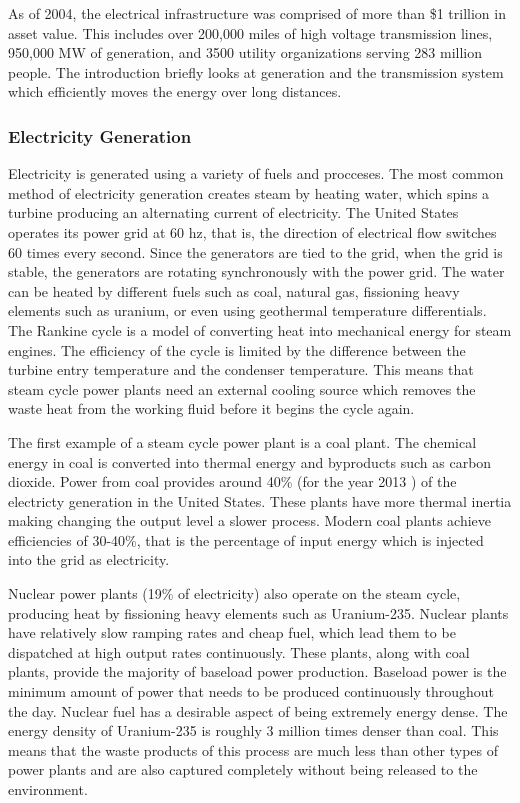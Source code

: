 	As of 2004, the electrical infrastructure was comprised of more than \$1 trillion in asset value.  This includes over 200,000 miles of high voltage transmission lines, 950,000 MW of generation, and 3500 utility organizations serving 283 million people.\cite{northeast_2003}  The introduction briefly looks at generation and the transmission system which efficiently moves the energy over long distances.

\subsubsection{Electricity Generation}
	Electricity is generated using a variety of fuels and procceses.  The most common method of electricity generation creates steam by heating water, which spins a turbine producing an alternating current of electricity.  The United States operates its power grid at 60 hz, that is, the direction of electrical flow switches 60 times every second.  Since the generators are tied to the grid, when the grid is stable, the generators are rotating synchronously with the power grid.  The water can be heated by different fuels such as coal, natural gas, fissioning heavy elements such as uranium, or even using geothermal temperature differentials.  The Rankine cycle is a model of converting heat into mechanical energy for steam engines.  The efficiency of the cycle is limited by the difference between the turbine entry temperature and the condenser temperature.  This means that steam cycle power plants need an external cooling source which removes the waste heat from the working fluid before it begins the cycle again.  

	The first example of a steam cycle power plant is a coal plant.  The chemical energy in coal is converted into thermal energy and byproducts such as carbon dioxide.  Power from coal provides around 40\% (for the year 2013 \cite{eia_gov}) of the electricty generation in the United States. These plants have more thermal inertia making changing the output level a slower process.  Modern coal plants achieve efficiencies of 30-40\%, that is the percentage of input energy which is injected into the grid as electricity.

	Nuclear power plants (19\% of electricity) also operate on the steam cycle, producing heat by fissioning heavy elements such as Uranium-235.  Nuclear plants have relatively slow ramping rates and cheap fuel, which lead them to be dispatched at high output rates continuously.  These plants, along with coal plants, provide the majority of baseload power production. Baseload power is the minimum amount of power that needs to be produced continuously throughout the day.  Nuclear fuel has a desirable aspect of being extremely energy dense.  The energy density of Uranium-235 is roughly 3 million times denser than coal.  This means that the waste products of this process are much less than other types of power plants and are also captured completely without being released to the environment.

